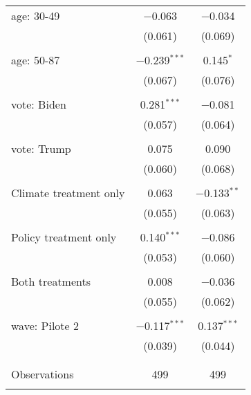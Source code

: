 \begin{tabular}{@{\extracolsep{5pt}}lcc}
 age: 30-49 & $-$0.063 & $-$0.034 \\ 
  & (0.061) & (0.069) \\ 
  & & \\ 
 age: 50-87 & $-$0.239$^{***}$ & 0.145$^{*}$ \\ 
  & (0.067) & (0.076) \\ 
  & & \\ 
 vote: Biden & 0.281$^{***}$ & $-$0.081 \\ 
  & (0.057) & (0.064) \\ 
  & & \\ 
 vote: Trump & 0.075 & 0.090 \\ 
  & (0.060) & (0.068) \\ 
  & & \\ 
 Climate treatment only & 0.063 & $-$0.133$^{**}$ \\ 
  & (0.055) & (0.063) \\ 
  & & \\ 
 Policy treatment only & 0.140$^{***}$ & $-$0.086 \\ 
  & (0.053) & (0.060) \\ 
  & & \\ 
 Both treatments & 0.008 & $-$0.036 \\ 
  & (0.055) & (0.062) \\ 
  & & \\ 
 wave: Pilote 2 & $-$0.117$^{***}$ & 0.137$^{***}$ \\ 
  & (0.039) & (0.044) \\ 
  & & \\ 
\hline \\[-1.8ex] 

Observations & 499 & 499 \\ 
\hline 
\hline \\[-1.8ex] 
\end{tabular} 